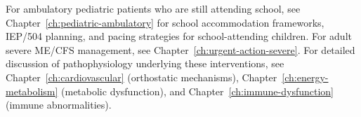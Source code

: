 \begin{continuation}
For ambulatory pediatric patients who are still attending school, see Chapter~\ref{ch:pediatric-ambulatory} for school accommodation frameworks, IEP/504 planning, and pacing strategies for school-attending children. For adult severe ME/CFS management, see Chapter~\ref{ch:urgent-action-severe}. For detailed discussion of pathophysiology underlying these interventions, see Chapter~\ref{ch:cardiovascular} (orthostatic mechanisms), Chapter~\ref{ch:energy-metabolism} (metabolic dysfunction), and Chapter~\ref{ch:immune-dysfunction} (immune abnormalities).
\end{continuation}

